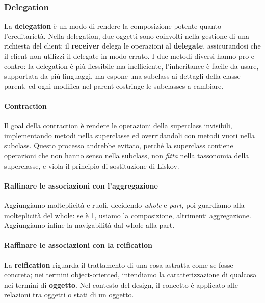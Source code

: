 \documentclass[11pt]{article}
\begin{document}
\subsubsection{Delegation}
La \textbf{delegation} è un modo di rendere la composizione potente quanto l'ereditarietà. Nella delegation, due oggetti sono coinvolti nella gestione di una richiesta del client: il \textbf{receiver} delega le operazioni al \textbf{delegate}, assicurandosi che il client non utilizzi il delegate in modo errato. I due metodi diversi hanno pro e contro: la delegation è più flessibile ma inefficiente, l'inheritance è facile da usare, supportata da più linguaggi, ma espone una subclass ai dettagli della classe parent, ed ogni modifica nel parent costringe le subclasses a cambiare.
\paragraph{Contraction}
Il goal della contraction è rendere le operazioni della superclass invisibili, implementando metodi nella superclasse ed overridandoli con metodi vuoti nella subclass. Questo processo andrebbe evitato, perché la superclass contiene operazioni che non hanno senso nella subclass, non \textit{fitta} nella tassonomia della superclasse, e viola il principio di sostituzione di Liskov. 
\paragraph{Raffinare le associazioni con l'aggregazione}
Aggiungiamo molteplicità e ruoli, decidendo \textit{whole} e \textit{part}, poi guardiamo alla molteplicità del whole: se è 1, usiamo la composizione, altrimenti aggregazione. Aggiungiamo infine la navigabilità dal whole alla part.
\paragraph{Raffinare le associazioni con la reification} 
La \textbf{reification} riguarda il trattamento di una cosa astratta come se fosse concreta; nei termini object-oriented, intendiamo la caratterizzazione di qualcosa nei termini di \textbf{oggetto}. Nel contesto del design, il concetto è applicato alle relazioni tra oggetti o stati di un oggetto. 
\end{document}
